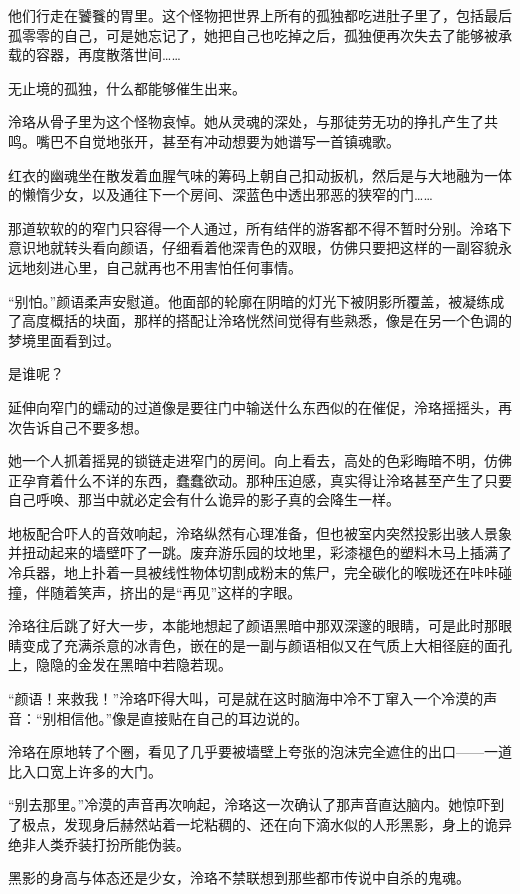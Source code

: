 \documentclass[UTF8, scheme = chinese, openany]{ctexbook}
\begin{document}
他们行走在饕餮的胃里。这个怪物把世界上所有的孤独都吃进肚子里了，包括最后孤零零的自己，可是她忘记了，她把自己也吃掉之后，孤独便再次失去了能够被承载的容器，再度散落世间……

无止境的孤独，什么都能够催生出来。

泠珞从骨子里为这个怪物哀悼。她从灵魂的深处，与那徒劳无功的挣扎产生了共鸣。嘴巴不自觉地张开，甚至有冲动想要为她谱写一首镇魂歌。

红衣的幽魂坐在散发着血腥气味的筹码上朝自己扣动扳机，然后是与大地融为一体的懒惰少女，以及通往下一个房间、深蓝色中透出邪恶的狭窄的门……

那道软软的的窄门只容得一个人通过，所有结伴的游客都不得不暂时分别。泠珞下意识地就转头看向颜语，仔细看着他深青色的双眼，仿佛只要把这样的一副容貌永远地刻进心里，自己就再也不用害怕任何事情。

“别怕。”颜语柔声安慰道。他面部的轮廓在阴暗的灯光下被阴影所覆盖，被凝练成了高度概括的块面，那样的搭配让泠珞恍然间觉得有些熟悉，像是在另一个色调的梦境里面看到过。

是谁呢？

延伸向窄门的蠕动的过道像是要往门中输送什么东西似的在催促，泠珞摇摇头，再次告诉自己不要多想。

她一个人抓着摇晃的锁链走进窄门的房间。向上看去，高处的色彩晦暗不明，仿佛正孕育着什么不详的东西，蠢蠢欲动。那种压迫感，真实得让泠珞甚至产生了只要自己呼唤、那当中就必定会有什么诡异的影子真的会降生一样。

地板配合吓人的音效响起，泠珞纵然有心理准备，但也被室内突然投影出骇人景象并扭动起来的墙壁吓了一跳。废弃游乐园的坟地里，彩漆褪色的塑料木马上插满了冷兵器，地上扑着一具被线性物体切割成粉末的焦尸，完全碳化的喉咙还在咔咔碰撞，伴随着笑声，挤出的是“再见”这样的字眼。

泠珞往后跳了好大一步，本能地想起了颜语黑暗中那双深邃的眼睛，可是此时那眼睛变成了充满杀意的冰青色，嵌在的是一副与颜语相似又在气质上大相径庭的面孔上，隐隐的金发在黑暗中若隐若现。

“颜语！来救我！”泠珞吓得大叫，可是就在这时脑海中冷不丁窜入一个冷漠的声音：“别相信他。”像是直接贴在自己的耳边说的。

泠珞在原地转了个圈，看见了几乎要被墙壁上夸张的泡沫完全遮住的出口——一道比入口宽上许多的大门。

“别去那里。”冷漠的声音再次响起，泠珞这一次确认了那声音直达脑内。她惊吓到了极点，发现身后赫然站着一坨粘稠的、还在向下滴水似的人形黑影，身上的诡异绝非人类乔装打扮所能伪装。

黑影的身高与体态还是少女，泠珞不禁联想到那些都市传说中自杀的鬼魂。
\end{document}
